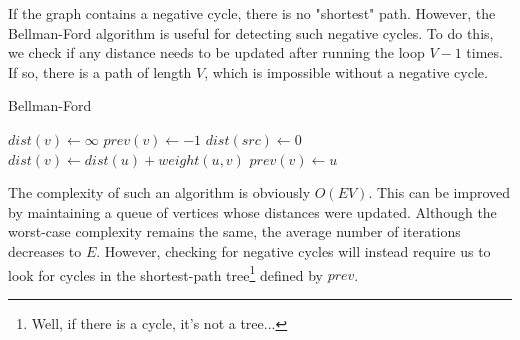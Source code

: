 If the graph contains a negative cycle, there is no "shortest" path. However, the Bellman-Ford algorithm is useful for detecting such negative cycles. To do this, we check if any distance needs to be updated after running the loop $V-1$ times. If so, there is a path of length $V$, which is impossible without a negative cycle.

\begin{algorithm}[H]
\caption{Bellman-Ford}
\begin{algorithmic}
	\State $dist(v) \gets \infty$
    \State $prev(v) \gets -1$
\EndFor
\State $dist(src) \gets 0$
    	    \State $dist(v) \gets dist(u)+weight(u,v)$
	        \State $prev(v) \gets u$
        \EndIf
	\EndFor
\EndFor
{}
	\EndIf
\EndFor
\end{algorithmic}
\end{algorithm}

The complexity of such an algorithm is obviously $O(E V)$. This can be improved by maintaining a queue of vertices whose distances were updated. Although the worst-case complexity remains the same, the average number of iterations decreases to $E$. However, checking for negative cycles will instead require us to look for cycles in the shortest-path tree\footnote{Well, if there is a cycle, it's not a tree...} defined by $prev$.


